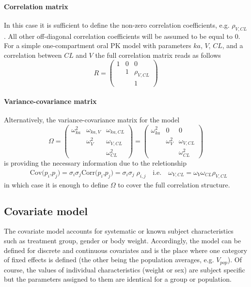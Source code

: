 \paragraph{Correlation matrix}
In this case it is sufficient to define the non-zero correlation coefficients, e.g. $\rho_{V,CL}$. All other off-diagonal correlation coefficients will be assumed to be equal to 0. For a simple one-compartment oral PK model with parameters $ka$, $V$, $CL$, and a correlation between $CL$ and $V$ the full correlation matrix reads as follows
\[
R =
 \begin{pmatrix}
  1 	& 0 	& 0  	\\
   		& 1	& \rho_{V,CL} \\
  		& 	& 1
 \end{pmatrix}
\]

\paragraph{Variance-covariance matrix}
\label{maths:covariance-mat-derivation}
Alternatively, the variance-covariance matrix for the model
\[
 \Omega =
 \begin{pmatrix}
  \omega_{ka}^2 	& \omega_{ka,V}	& \omega_{ka,CL}\\
   			  	& \omega_{V}^2	& \omega_{V,CL} \\
  				& 				& \omega_{CL}^2
 \end{pmatrix}
 =
  \begin{pmatrix}
  \omega_{ka}^2 	& 0				& 0 \\
   			  	& \omega_{V}^2	& \omega_{V,CL} \\
  				& 				& \omega_{CL}^2
 \end{pmatrix}
\]
is providing the necessary information due to the reletionship
\begin{align*}
	&\mbox{Cov($p_i$,$p_j$)} = \sigma_i \sigma_j \mbox{Corr($p_i$,$p_j$)}  = \sigma_i \sigma_j \;\rho_{i,j} \quad \mbox{i.e.} \quad \omega_{V,CL} = \omega_V \omega_{CL} \rho_{V,CL}
\end{align*}
in which case it is enough to define $\Omega$ to cover the full correlation structure.


\subsection{Covariate model}
\label{maths:covariate_model}

The covariate model accounts for systematic or known subject
characteristics such as treatment group, gender or body
weight. Accordingly, the model can be defined for discrete and
continuous covariates and is the place where one category of fixed
effects is defined (the other being
the population averages, e.g. $V_{pop}$). Of course, the values of
individual characteristics (weight or sex) are subject specific but
the parameters assigned to them are identical for a group or
population.

